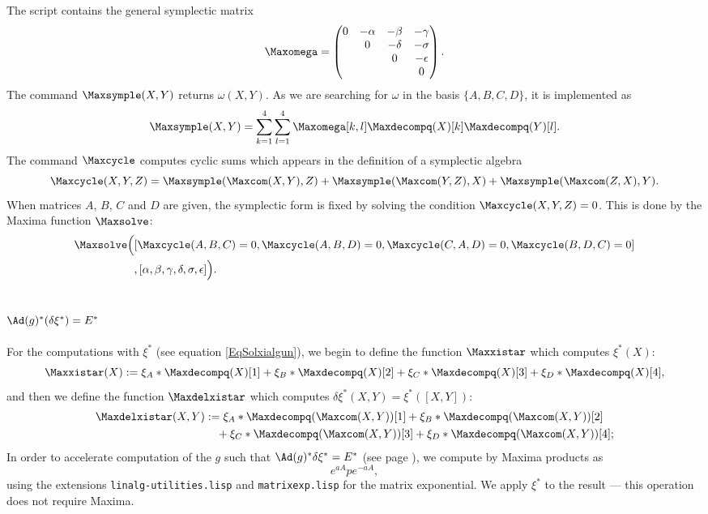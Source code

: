 The script  contains the general symplectic matrix
\[ 
  \Maxomega=\begin{pmatrix}
 0	&	-\alpha	&-\beta&-\gamma\\
&0&-\delta&-\sigma\\
&&0&-\epsilon\\
&&&0
\end{pmatrix}.
\]
The command $\Maxsymple(X,Y)$ returns $\omega(X,Y)$. As we are searching for $\omega$ in the basis $\{ A,B,C,D \}$, it is implemented as
\[ 
  \Maxsymple(X,Y)=\sum_{k=1}^{4}\sum_{l=1}^{4}\Maxomega[k,l]\Maxdecompq(X)[k]\Maxdecompq(Y)[l].
\]
The command $\Maxcycle$ computes cyclic sums which appears in the definition of a symplectic algebra%
\begin{equation}
\Maxcycle(X,Y,Z)=\Maxsymple(\Maxcom(X,Y),Z)+\Maxsymple(\Maxcom(Y,Z),X)+\Maxsymple(\Maxcom(Z,X),Y).
\end{equation}
When matrices $A$, $B$, $C$ and $D$ are given, the symplectic form is fixed by solving the condition $\Maxcycle(X,Y,Z)=0$. This is done by the Maxima function $\Maxsolve$:
\[ 
\begin{split}
\Maxsolve\Big(&  [\Maxcycle(A,B,C)=0,\Maxcycle(A,B,D)=0,\Maxcycle(C,A,D)=0,\Maxcycle(B,D,C)=0]\\
		&,[\alpha,\beta,\gamma,\delta,\sigma,\epsilon] \Big).
\end{split}
\]

\subsection{\texorpdfstring{$\Ad(g)^*(\delta\xi^*)=E^*$}{AdgxiE}}

For the computations with $\xi^*$ (see equation  \ref{EqSolxialgun}), we begin to define the function $\Maxxistar$ which computes $\xi^*(X)$:
\[ 
\Maxxistar(X):=\xi_{A}*\Maxdecompq(X)[1]+\xi_{B}*\Maxdecompq(X)[2]+\xi_{C}*\Maxdecompq(X)[3]+\xi_{D}*\Maxdecompq(X)[4],
\]
and then we define the function $\Maxdelxistar$ which computes $\delta\xi^*(X,Y)=\xi^*([X,Y])$:
\[ 
\begin{split}
\Maxdelxistar(X,Y)&:=\xi_{A}*\Maxdecompq(\Maxcom(X,Y))[1]+\xi_{B}*\Maxdecompq(\Maxcom(X,Y))[2]\\
	&\quad+\xi_{C}*\Maxdecompq(\Maxcom(X,Y))[3]+\xi_{D}*\Maxdecompq(\Maxcom(X,Y))[4];
\end{split}
\]
In order to accelerate computation of  the $g$ such that $\Ad(g)^*\delta\xi^*=E^*$ (see page \pageref{PgAdgXEbbekl}), we compute by Maxima products as
\[ 
   e^{aA}p e^{-aA},
\]
using the extensions \texttt{linalg-utilities.lisp} and \texttt{matrixexp.lisp} for the matrix exponential. We apply $\xi^*$ to the result --- this operation does not require Maxima.

